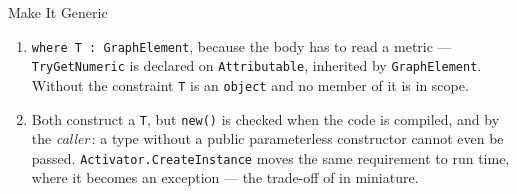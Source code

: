 \begin{solutionframe}{Make It Generic}
  \begin{enumerate}
    \item \texttt{where T : GraphElement}, because the body has to read a
      metric --- \texttt{TryGetNumeric} is declared on \texttt{Attributable},
      inherited by \texttt{GraphElement}. Without the constraint \texttt{T} is
      an \texttt{object} and no member of it is in scope.
    \item Both construct a \texttt{T}, but \texttt{new()} is checked when the
      code is compiled, and by the \emph{caller}\,: a type without a public
      parameterless constructor cannot even be passed.
      \texttt{Activator.CreateInstance} moves the same requirement to run time,
      where it becomes an exception --- the trade-off of
       in miniature.
  \end{enumerate}
\end{solutionframe}

